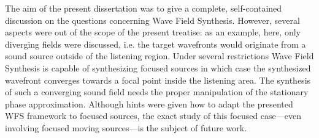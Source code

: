 \vspace{3mm}
The aim of the present dissertation was to give a complete, self-contained discussion on the questions concerning Wave Field Synthesis.
However, several aspects were out of the scope of the present treatise: as an example, here, only diverging fields were discussed, i.e. the target wavefronts would originate from a sound source outside of the listening region.
Under several restrictions Wave Field Synthesis is capable of synthesizing focused sources in which case the synthesized wavefront converges towards a focal point inside the listening area.
The synthesis of such a converging sound field needs the proper manipulation of the stationary phase approximation.
Although hints were given how to adapt the presented WFS framework to focused sources, the exact study of this focused case---even involving focused moving sources---is the subject of future work.